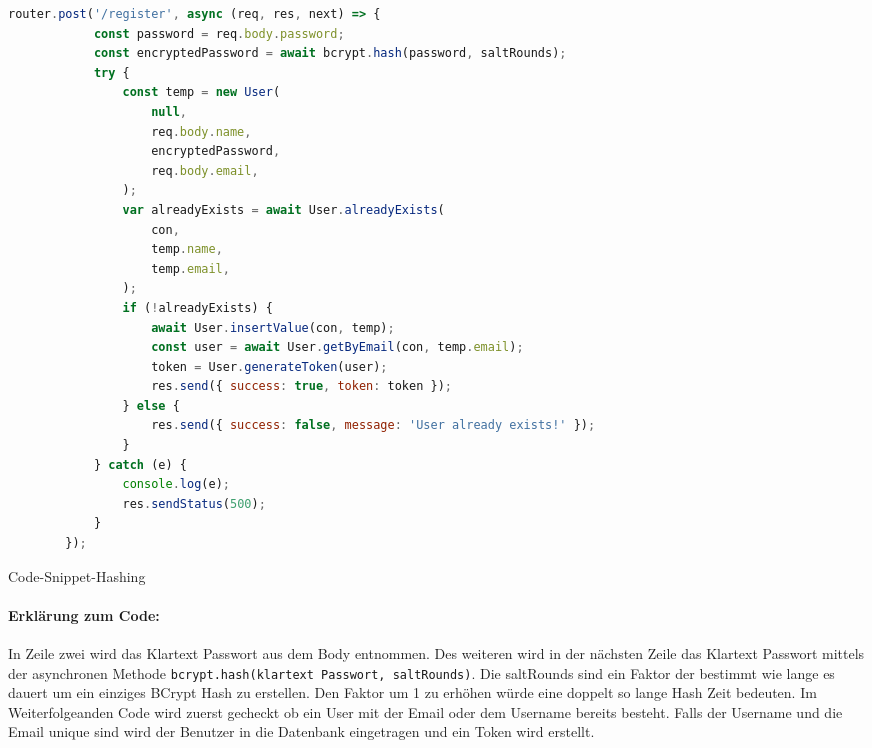 \begin{code}[H]
    \begin{lstlisting}[firstnumber=1,language=JavaScript, style=CMD]
        router.post('/register', async (req, res, next) => {
            const password = req.body.password;
            const encryptedPassword = await bcrypt.hash(password, saltRounds);
            try {
                const temp = new User(
                    null,
                    req.body.name,
                    encryptedPassword,
                    req.body.email,
                );
                var alreadyExists = await User.alreadyExists(
                    con,
                    temp.name,
                    temp.email,
                );
                if (!alreadyExists) {
                    await User.insertValue(con, temp);
                    const user = await User.getByEmail(con, temp.email);
                    token = User.generateToken(user);
                    res.send({ success: true, token: token });
                } else {
                    res.send({ success: false, message: 'User already exists!' });
                }
            } catch (e) {
                console.log(e);
                res.sendStatus(500);
            }
        });
    \end{lstlisting}
    \caption{Code-Snippet-Hashing}
\end{code}

\paragraph{Erklärung zum Code:}
In Zeile zwei wird das Klartext Passwort aus dem Body entnommen. Des weiteren
wird in der nächsten Zeile das Klartext Passwort mittels der asynchronen Methode
\texttt{bcrypt.hash(klartext Passwort, saltRounds)}. Die saltRounds sind ein
Faktor der bestimmt wie lange es dauert um ein einziges BCrypt Hash zu erstellen.
Den Faktor um 1 zu erhöhen würde eine doppelt so lange Hash Zeit bedeuten.
Im Weiterfolgeanden Code wird zuerst gecheckt ob ein User mit der Email oder dem Username bereits
besteht. Falls der Username und die Email unique sind wird der Benutzer
in die Datenbank eingetragen und ein Token \underline{} wird erstellt.
\cite{MySQL}
\label{db}

